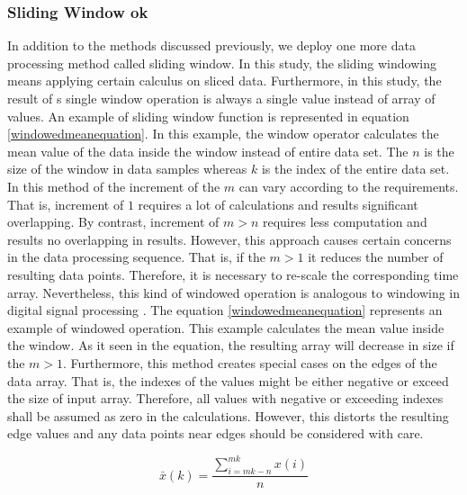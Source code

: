 \documentclass[english,12pt,a4paper,pdftex,elec,utf8]{aaltothesis}
\begin{document}

\subsubsection{Sliding Window ok} \label{slidingwindowsection}

In addition to the methods discussed previously, we deploy one more data processing method called sliding window. In this study, the sliding windowing means applying certain calculus on sliced data. Furthermore, in this study, the result of s single window operation is always a single value instead of array of values. An example of sliding window function is represented in equation \ref{windowedmeanequation}. In this example, the window operator calculates the mean value of the data inside the window instead of entire data set. The $n$ is the size of the window in data samples whereas $k$ is the index of the entire data set. In this method of the increment of the $m$ can vary according to the requirements. That is, increment of $1$ requires a lot of calculations and results significant overlapping. By contrast, increment of $m > n$ requires less computation and results no overlapping in results. However, this approach causes certain concerns in the data processing sequence. That is, if the $m > 1$ it reduces the number of resulting data points. Therefore, it is necessary to re-scale the corresponding time array. Nevertheless, this kind of windowed operation is analogous to windowing in digital signal processing \cite{tan2007digital} \cite{miao2007signal}. The equation \ref{windowedmeanequation} represents an example of windowed operation. This example calculates the mean value inside the window. As it seen in the equation, the resulting array will decrease in size if the $m > 1$. Furthermore, this method creates special cases on the edges of the data array. That is, the indexes of the values might be either negative or exceed the size of input array. Therefore, all values with negative or exceeding indexes shall be assumed as zero in the calculations. However, this distorts the resulting edge values and any data points near edges should be considered with care.

\begin{equation} \label{windowedmeanequation}
\bar{x}(k) = \frac{ \sum\limits^{mk}_{i = mk - n} x(i)}{n}
\end{equation} 
\end{document}
